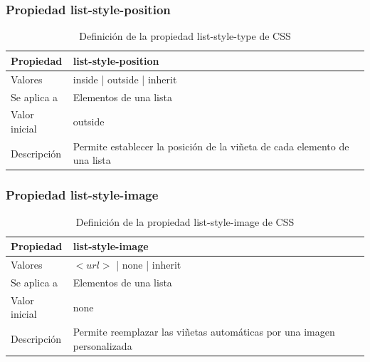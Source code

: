 
\begin{frame}
\frametitle{Propiedad list-style-position}

\begin{center}
  \begin{table}
   \begin{tabular}{p{1.8cm}p{7.8cm}}
Propiedad & \bf{list-style-position} \\ \hline
Valores& inside | outside | inherit \\ \hline
Se aplica a& Elementos de una lista \\ \hline
Valor inicial& outside \\ \hline
Descripción& Permite establecer la posición de la viñeta de cada elemento de una lista \\ \hline
  \end{tabular}
   \caption{Definición de la propiedad list-style-type de CSS}
 \end{table}
\end{center}


\end{frame}



\begin{frame}
\frametitle{Propiedad list-style-image}

\begin{center}
  \begin{table}
   \begin{tabular}{p{1.8cm}p{7.8cm}}
Propiedad & \bf{list-style-image} \\ \hline
Valores& $<url>$ | none | inherit \\ \hline
Se aplica a& Elementos de una lista \\ \hline
Valor inicial& none \\ \hline
Descripción& Permite reemplazar las viñetas automáticas por una imagen personalizada \\ \hline
  \end{tabular}
   \caption{Definición de la propiedad list-style-image de CSS}
 \end{table}
\end{center}


\end{frame}



